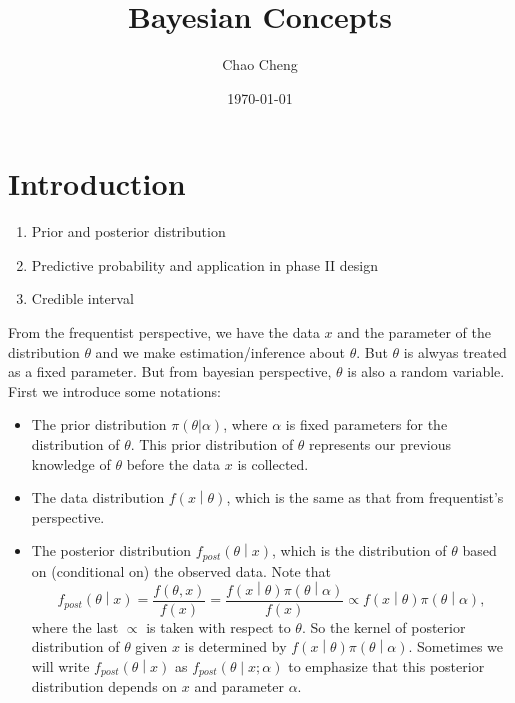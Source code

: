 \documentclass[a4paper,12pt]{article}
\title{Bayesian Concepts}
\author{Chao Cheng}
\date{\today}
\begin{document}
\maketitle
\tableofcontents{}

\section{Introduction}
\label{sec:introduction}

\begin{enumerate}
\item Prior and posterior distribution
\item Predictive probability and application in phase II design
\item Credible interval
\end{enumerate}

From the frequentist perspective, we have the data $x$ and the parameter of the distribution $\theta$ and we make estimation/inference about $\theta$. But $\theta$ is alwyas treated as a fixed parameter. But from bayesian perspective, $\theta$ is also a random variable.
First we introduce some notations:

\begin{itemize}
\item The prior distribution
  $\pi\left(\theta | \alpha\right)$, where $\alpha$ is fixed parameters for the distribution of $\theta$. This prior distribution of $\theta$ represents our previous  knowledge of $\theta$ before the data $x$ is collected.
\item The data distribution
  $f\left(x\middle|\theta\right)$, which is the same as that from frequentist's perspective.
\item The posterior distribution
  $f_{post}\left(\theta\middle| x\right)$, which is the distribution of $\theta$ based on (conditional on) the observed data. Note that
  \[
    f_{post}\left(\theta\middle| x\right)
    = \frac{f\left(\theta, x\right)}{f\left(x\right)}
    = \frac{
      f\left(x\middle|\theta\right)\pi\left(\theta\middle|\alpha\right)
    }{f\left(x\right)}
    \propto f\left(x\middle|\theta\right)\pi\left(\theta\middle|\alpha\right)
    ,
  \]
  where the last $\propto$ is taken with respect to $\theta$. So the kernel of posterior distribution of $\theta$ given $x$ is determined by $f\left(x\middle|\theta\right)\pi\left(\theta\middle|\alpha\right)$. Sometimes we will write $f_{post}\left(\theta\middle|x\right)$ as $f_{post}\left(\theta\middle|x;\alpha\right)$ to emphasize that this posterior distribution depends on $x$ and parameter $\alpha$.
\end{itemize}
\end{document}
